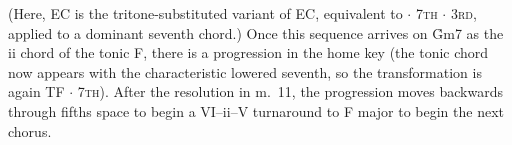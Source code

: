 \noindent (Here, EC is the tritone-substituted variant of EC,
equivalent to \tft $\cdot$ \textsc{7th} $\cdot$ \textsc{3rd}, applied to a
dominant seventh chord.) Once this sequence arrives on \h{Gm7} as the ii chord
of the tonic F, there is a \tfo progression in the home key (the tonic chord
now appears with the characteristic lowered seventh, so the transformation is
again TF $\cdot$ \textsc{7th}). After the resolution in m.~11, the progression
moves backwards through fifths space to begin a VI--ii--V turnaround to F
major to begin the next chorus.






